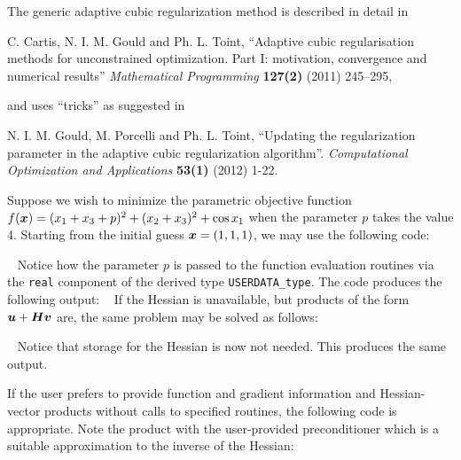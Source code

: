 \documentclass{galahad}
\begin{document}
\galreferences
\vspace*{1mm}

\noindent
The generic adaptive cubic regularization method is described in detail in
\vspace*{1mm}

\noindent
C. Cartis,  N. I. M. Gould and Ph. L. Toint,
``Adaptive cubic regularisation methods for unconstrained optimization.
Part I: motivation, convergence and numerical results''
{\em Mathematical Programming} {\bf 127(2)} (2011) 245--295,
\vspace*{1mm}

\noindent
and uses ``tricks'' as suggested in
\vspace*{1mm}

\noindent
N. I. M. Gould, M. Porcelli and Ph. L. Toint,
``Updating the regularization parameter in the adaptive cubic regularization
algorithm''.
{\em Computational Optimization and Applications}
{\bf 53(1)} (2012) 1-22.


\galexamples
Suppose we wish to minimize the parametric objective function
$f({\bm{x}}) = ( x_1 + x_3 + p )^2 + ( x_2 + x_3 )^2 + \cos x_1$
when the parameter $p$ takes the value 4. Starting from the
initial guess ${\bm{x}} = (1,1,1)$,
we may use the following code:

{\tt \small
\VerbatimInput{\packageexample}
}
\noindent
Notice how the parameter $p$ is passed to the function evaluation
routines via the {\tt real} component of the derived type {\tt USERDATA\_type}.
The code produces the following output:
{\tt \small
\VerbatimInput{\packageresults}
}
\noindent
If the Hessian is unavailable, but products of the form
${\bm{u}} + {\bm{H}} {\bm{v}}$ are, the same problem may be solved as follows:

{\tt \small
\VerbatimInput{\packageexampleb}
}
\noindent
Notice that storage for the Hessian is now not needed.
This produces the same output.

If the user prefers to provide function and gradient information and
Hessian-vector products
without calls to specified routines, the following code is appropriate.
Note the product with the user-provided preconditioner
which is a suitable approximation to the inverse of the Hessian:

{\tt \small
\VerbatimInput{\packageexamplec}
}
\noindent
\noindent
\end{document}
